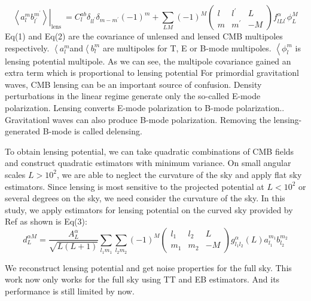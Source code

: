 \documentclass[12pt, notitlepage, onecolumn, amsmath, amssymb, aps]{revtex4-1}
\begin{document}
\begin{equation}
  \left.\left\langle a_{l}^{m} b_{l^{\prime}}^{m^{\prime}}\right\rangle\right|_{\text {lens }}=C_{l}^{a b} \delta_{l l^{\prime}} \delta_{m-m^{\prime}}(-1)^{m}+\sum_{L M}(-1)^{M}\left(\begin{array}{ccc}
{l} & {l^{\prime}} & {L} \\
{m} & {m^{\prime}} & {-M}
\end{array}\right) f_{l L l^{\prime}}^{\alpha} \phi_{L}^{M}
\end{equation}
Eq(1) and Eq(2) are the covariance of unlensed and lensed CMB multipoles respectively. \(\left\langle a_{l}^{m} \)and\(\left\langle b_{l}^{m} \)  are multipoles for T, E or B-mode multipoles. \(\left\langle \phi_{l}^{m}\) is lensing potential multipole. As we can see, the multipole covariance gained an extra term which is proportional to lensing potential 
For primordial gravitationl waves, CMB lensing can be an important source of confusion\cite{Lewis:2006fu}. Density perturbations in the linear regime generate only the so-called E-mode polarization\cite{Kamionkowski:1996ks}. Lensing converts E-mode polarization to B-mode polarization.\cite{Zaldarriaga:1998ar}. Gravitationl waves can also produce B-mode polarization\cite{Hu:2000ee}. Removing the lensing-generated B-mode is called delensing.

To obtain lensing potential, we can take quadratic combinations of CMB fields and construct quadratic estimators with minimum variance\cite{Hu:2000ee}. On small angular scales \(L>10^2\), we are able to neglect the curvature of the sky and apply flat sky estimators\cite{Hu:2001kj}. Since lensing is most sensitive to the projected potential at \(L<10^2\) or several degrees on the sky, we need consider the curvature of the sky. In this study, we apply estimators for lensing potential on the curved sky provided by Ref\cite{Okamoto:2003zw} as shown is Eq(3):
\begin{equation}
  d_{L}^{\alpha M}=\frac{A_{L}^{\alpha}}{\sqrt{L(L+1)}} \sum_{l_{1} m_{1}} \sum_{l_{2} m_{2}}(-1)^{M}\left(\begin{array}{ccc}
{l_{1}} & {l_{2}} & {L} \\
{m_{1}} & {m_{2}} & {-M}
\end{array}\right) g_{l_{1} l_{2}}^{\alpha}(L) a_{l_{1}}^{m_{1}} b_{l_{2}}^{m_{2}}
\end{equation}


We reconstruct lensing potential and get noise properties for the full sky. This work now only works for the full sky using TT and EB estimators. And its performance is still limited by now. 
\end{document}
